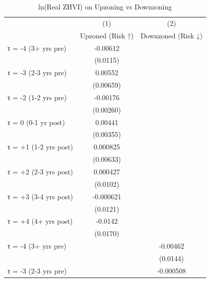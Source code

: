 \begin{table}[htbp]\centering
\def\sym#1{\ifmmode^{#1}\else\(^{#1}\)\fi}
\caption{ln(Real ZHVI) on Upzoning vs Downzoning}
\label{tab:updown}
\begin{tabular}{l*{2}{c}}
\hline\hline
                    &\multicolumn{1}{c}{(1)}&\multicolumn{1}{c}{(2)}\\
                    &\multicolumn{1}{c}{Upzoned (Risk ↑)}&\multicolumn{1}{c}{Downzoned (Risk ↓)}\\
\hline
τ = -4 (3+ yrs pre) &    -0.00612         &                     \\
                    &    (0.0115)         &                     \\
[0.15em]
τ = -3 (2-3 yrs pre)&     0.00552         &                     \\
                    &   (0.00659)         &                     \\
[0.15em]
τ = -2 (1-2 yrs pre)&    -0.00176         &                     \\
                    &   (0.00260)         &                     \\
[0.15em]
τ = 0 (0-1 yr post) &     0.00441         &                     \\
                    &   (0.00355)         &                     \\
[0.15em]
τ = +1 (1-2 yrs post)&    0.000825         &                     \\
                    &   (0.00633)         &                     \\
[0.15em]
τ = +2 (2-3 yrs post)&    0.000427         &                     \\
                    &    (0.0102)         &                     \\
[0.15em]
τ = +3 (3-4 yrs post)&   -0.000621         &                     \\
                    &    (0.0121)         &                     \\
[0.15em]
τ = +4 (4+ yrs post)&     -0.0142         &                     \\
                    &    (0.0170)         &                     \\
[0.15em]
τ = -4 (3+ yrs pre) &                     &    -0.00462         \\
                    &                     &    (0.0144)         \\
[0.15em]
τ = -3 (2-3 yrs pre)&                     &   -0.000508         \\

\end{tabular}
\end{table}
